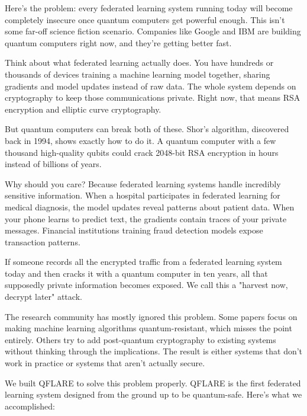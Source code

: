\documentclass[journal]{IEEEtran}
\begin{document}
Here's the problem: every federated learning system running today will become completely insecure once quantum computers get powerful enough. This isn't some far-off science fiction scenario. Companies like Google and IBM are building quantum computers right now, and they're getting better fast.

Think about what federated learning actually does. You have hundreds or thousands of devices training a machine learning model together, sharing gradients and model updates instead of raw data. The whole system depends on cryptography to keep those communications private. Right now, that means RSA encryption and elliptic curve cryptography.

But quantum computers can break both of these. Shor's algorithm, discovered back in 1994, shows exactly how to do it. A quantum computer with a few thousand high-quality qubits could crack 2048-bit RSA encryption in hours instead of billions of years.

Why should you care? Because federated learning systems handle incredibly sensitive information. When a hospital participates in federated learning for medical diagnosis, the model updates reveal patterns about patient data. When your phone learns to predict text, the gradients contain traces of your private messages. Financial institutions training fraud detection models expose transaction patterns.

If someone records all the encrypted traffic from a federated learning system today and then cracks it with a quantum computer in ten years, all that supposedly private information becomes exposed. We call this a "harvest now, decrypt later" attack.

The research community has mostly ignored this problem. Some papers focus on making machine learning algorithms quantum-resistant, which misses the point entirely. Others try to add post-quantum cryptography to existing systems without thinking through the implications. The result is either systems that don't work in practice or systems that aren't actually secure.

We built QFLARE to solve this problem properly. QFLARE is the first federated learning system designed from the ground up to be quantum-safe. Here's what we accomplished:
\end{document}
